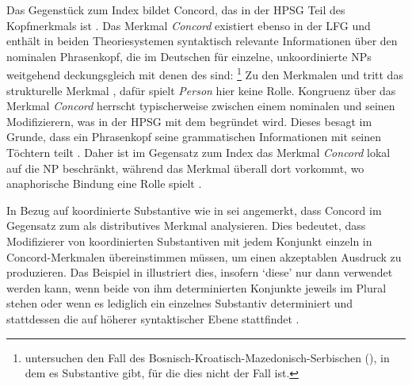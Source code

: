 \begin{exe}
\ex\label{ex:coordidx}
\begin{xlist}
\end{xlist}
\end{exe}


\label{phsec:concord}

Das Gegenstück zum Index bildet Concord, das in der HPSG Teil des Kopfmerkmals ist
\autocite[17]{wechslerzlatic2003}. Das Merkmal \emph{Concord} existiert ebenso
in der LFG \autocite[189--192]{bresnanetal2016}
und enthält in beiden Theoriesystemen syntaktisch relevante Informationen über
den nominalen Phrasenkopf, die im Deutschen für einzelne,
unkoordinierte NPs weitgehend deckungsgleich mit denen des
 sind:%
%
	\footnote{\citet{wechslerzlatic2003} untersuchen den Fall des
	Bosnisch-Kroatisch-Mazedonisch-Serbischen (), in dem es
	Substantive gibt, für die dies nicht der Fall ist.}
%
Zu den Merkmalen \emph{} und \emph{} tritt das
strukturelle Merkmal \emph{}, dafür spielt \emph{Person} hier keine
Rolle. Kongruenz über das Merkmal \emph{Concord} herrscht typischerweise
zwischen einem nominalen  und seinen Modifizierern, was in der
HPSG mit dem  begründet wird. Dieses besagt im Grunde, dass ein Phrasenkopf seine
grammatischen Informationen mit seinen Töchtern teilt
\autocites[vgl.][34]{pollardsag1994}[22]{wechslerzlatic2003}. Daher ist im
Gegensatz zum Index das Merkmal \emph{Concord} lokal auf die
NP beschränkt, während das Merkmal \emph{} überall
dort vorkommt, wo anaphorische Bindung eine Rolle
spielt \parencites[14--16, 22]{wechslerzlatic2003}[189]{bresnanetal2016}.

In Bezug auf koordinierte Substantive wie in
 sei angemerkt, dass \citet[76--78]{kingdalrymple2004} Concord
im Gegensatz zum  als distributives Merkmal analysieren. Dies bedeutet, dass
Modifizierer von koordinierten Substantiven mit jedem Konjunkt einzeln in
Concord-Merkmalen übereinstimmen müssen, um einen akzeptablen Ausdruck zu
produzieren. Das Beispiel in  illustriert dies, insofern
 `diese' nur dann verwendet werden kann, wenn beide von ihm
determinierten Konjunkte jeweils im Plural stehen  oder
wenn es lediglich ein einzelnes Substantiv determiniert und stattdessen die
 auf höherer syntaktischer Ebene stattfindet
.

